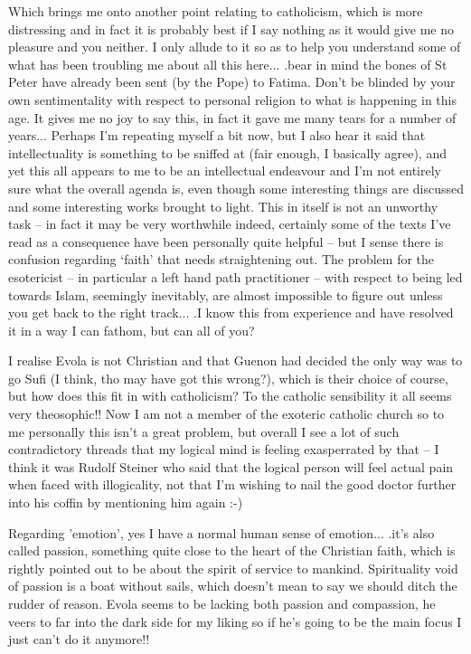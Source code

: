 \begin{footnotesize}
\begin{sffamily}
Which brings me onto another point relating to catholicism, which is more distressing and in fact it is probably best if I say nothing as it would give me no pleasure and you neither. I only allude to it so as to help you understand some of what has been troubling me about all this here... .bear in mind the bones of St Peter have already been sent (by the Pope) to Fatima. Don't be blinded by your own sentimentality with respect to personal religion to what is happening in this age. It gives me no joy to say this, in fact it gave me many tears for a number of years... Perhaps I'm repeating myself a bit now, but I also hear it said that intellectuality is something to be sniffed at (fair enough, I basically agree), and yet this all appears to me to be an intellectual endeavour and I'm not entirely sure what the overall agenda is, even though some interesting things are discussed and some interesting works brought to light. This in itself is not an unworthy task -- in fact it may be very worthwhile indeed, certainly some of the texts I've read as a consequence have been personally quite helpful -- but I sense there is confusion regarding `faith' that needs straightening out. The problem for the esotericist -- in particular a left hand path practitioner -- with respect to being led towards Islam, seemingly inevitably, are almost impossible to figure out unless you get back to the right track... .I know this from experience and have resolved it in a way I can fathom, but can all of you?

I realise Evola is not Christian and that Guenon had decided the only way was to go Sufi (I think, tho may have got this wrong?), which is their choice of course, but how does this fit in with catholicism? To the catholic sensibility it all seems very theosophic!! Now I am not a member of the exoteric catholic church so to me personally this isn't a great problem, but overall I see a lot of such contradictory threads that my logical mind is feeling exasperrated by that -- I think it was Rudolf Steiner who said that the logical person will feel actual pain when faced with illogicality, not that I'm wishing to nail the good doctor further into his coffin by mentioning him again :-)

Regarding 'emotion', yes I have a normal human sense of emotion... .it's also called passion, something quite close to the heart of the Christian faith, which is rightly pointed out to be about the spirit of service to mankind. Spirituality void of passion is a boat without sails, which doesn't mean to say we should ditch the rudder of reason. Evola seems to be lacking both passion and compassion, he veers to far into the dark side for my liking so if he's going to be the main focus I just can't do it anymore!!


\end{sffamily}
\end{footnotesize}
